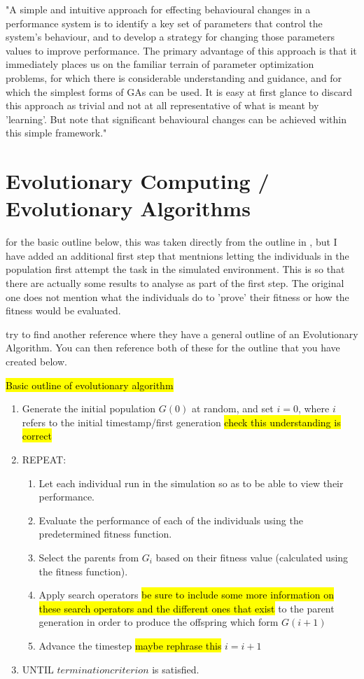 "A simple and intuitive approach for effecting behavioural changes in a performance system is to identify a key set of parameters that control the system's behaviour, and to develop a strategy for changing those parameters values to improve performance. The primary advantage of this approach is that it immediately places us on the familiar terrain of parameter optimization problems, for which there is considerable understanding and guidance, and for which the simplest forms of GAs can be used. It is easy at first glance to discard this approach as trivial and not at all representative of what is meant by 'learning'. But note that significant behavioural changes can be achieved within this simple framework."

\section{Evolutionary Computing / Evolutionary Algorithms}

for the basic outline below, this was taken directly from the outline in \cite{XinYao1999}, but I have added an additional first step that mentnions letting the individuals in the population first attempt the task in the simulated environment. This is so that there are actually some results to analyse as part of the first step. The original one does not mention what the individuals do to 'prove' their fitness or how the fitness would be evaluated.

try to find another reference where they have a general outline of an Evolutionary Algorithm. You can then reference both of these for the outline that you have created below.

\hl{Basic outline of evolutionary algorithm}
\begin{enumerate} \label{EA-Overview}
	\item Generate the initial population $G(0)$ at random, and set $i = 0$, where $i$ refers to the initial timestamp/first generation \hl{check this understanding is correct}
	\item REPEAT:
		\begin{enumerate}
			\item Let each individual run in the simulation so as to be able to view their performance.
			\item Evaluate the performance of each of the individuals using the predetermined fitness function.
			\item Select the parents from $G_i$ based on their fitness value (calculated using the fitness function).
			\item Apply search operators \hl{be sure to include some more information on these search operators and the different ones that exist} to the parent generation in order to produce the offspring which form $G(i+1)$
			\item Advance the timestep \hl{maybe rephrase this} $i=i+1$
		\end{enumerate}
	\item UNTIL $termination criterion$ is satisfied.
\end{enumerate}

